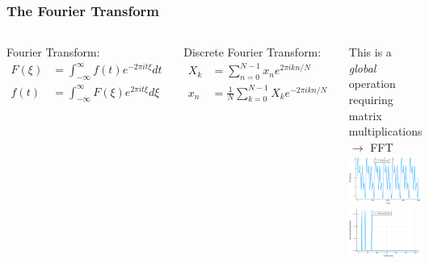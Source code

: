 \documentclass{beamer}
\begin{document}
\begin{frame}
\frametitle{The Fourier Transform}

\begin{columns}
Fourier Transform:
\begin{align*}
F(\xi) &= \int_{-\infty}^{\infty}f(t)e^{-2\pi i t \xi}dt\\
f(t) &= \int_{-\infty}^{\infty}F(\xi)e^{2\pi i t \xi}d\xi
\end{align*}

Discrete Fourier Transform:
\begin{align*}
X_k &= \sum_{n=0}^{N-1} x_ne^{2\pi i k n / N}\\
x_n &= \frac{1}{N}\sum_{k=0}^{N-1} X_ke^{-2\pi i k n / N}
\end{align*}

This is a \textit{global} operation requiring matrix multiplications $\rightarrow$ FFT
\includegraphics[width=\textwidth]{time_0066.png}
\includegraphics[width=\textwidth]{freq_0066.png}
\end{columns}
\end{frame}
\end{document}
